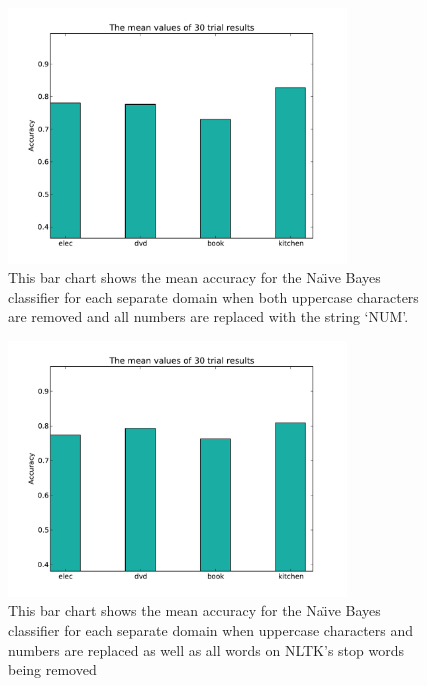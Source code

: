 \documentclass{llncs}
\begin{document}
\begin{figure}
    \centering
    \includegraphics[width=0.8\textwidth]{nb_feature_extractor_num.pdf}
    \caption{This bar chart shows the mean accuracy for the Na\"\i ve Bayes classifier for each separate domain when both uppercase characters are removed and all numbers are replaced with the string `NUM'.}
    \label{fig:fe_num}
\end{figure}

\begin{figure}
    \centering
    \includegraphics[width=0.8\textwidth]{nb_feature_extractor_stopwords.pdf}
    \caption{This bar chart shows the mean accuracy for the Na\"\i ve Bayes classifier for each separate domain when uppercase characters and numbers are replaced as well as all words on NLTK's stop words being removed}
    \label{fig:fe_stopwords}
\end{figure}
\end{document}
